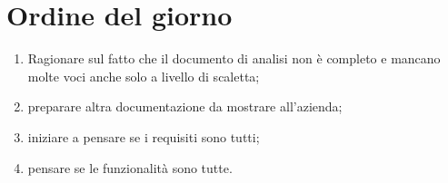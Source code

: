 \section{Ordine del giorno}

\begin{enumerate}
    \item Ragionare sul fatto che il documento di analisi non è completo e mancano molte voci anche solo a livello di scaletta;
    \item preparare altra documentazione da mostrare all’azienda;
    \item iniziare a pensare se i requisiti sono tutti;
    \item pensare se le funzionalità sono tutte.
\end{enumerate}